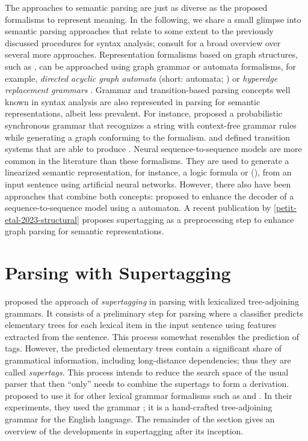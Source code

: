 \documentclass[../document.tex]{subfiles}
\begin{document}
    The approaches to semantic parsing are just as diverse as the proposed formalisms to represent meaning.
    In the following, we share a small glimpse into semantic parsing approaches that relate to some extent to the previously discussed procedures for syntax analysis; consult \citet{kamath2018survey} for a broad overview over several more approaches.
    Representation formalisms based on graph structures, such as , can be approached using graph grammar or automata formalisms, for example, \emph{directed acyclic graph automata} (short:  automata; \citealp{fancellu-etal-2019-semantic}) or \emph{hyperedge replacement grammars} \citep{drewes1997hyperedge}.
    Grammar and transition-based parsing concepts well known in syntax analysis are also represented in parsing for semantic representations, albeit less prevalent.
    For instance, \citet{peng2015synchronous} proposed a probabilistic synchronous grammar that recognizes a string with context-free grammar rules while generating a graph conforming to the  formalism.
     and \citet{vilares-gomez-rodriguez-2018-transition} defined transition systems that are able to produce .
    Neural sequence-to-sequence models are more common in the literature than these formalisms.
    They are used to generate a linearized semantic representation, for instance, a logic formula \citep{dong-lapata-2016-language} or  (\citep{zhang-etal-2019-amr}), from an input sentence using artificial neural networks.
    However, there also have been approaches that combine both concepts:  proposed to enhance the decoder of a sequence-to-sequence model using a  automaton.
    A recent publication by \cref{petit-etal-2023-structural} proposes supertagging as a preprocessing step to enhance graph parsing for semantic representations.

    \section{Parsing with Supertagging}\label{sec:literature:supertagging}
     proposed the approach of \emph{supertagging} in parsing with lexicalized tree-adjoining grammars.
    It consists of a preliminary step for parsing where a classifier predicts elementary trees for each lexical item in the input sentence using features extracted from the sentence.
    This process somewhat resembles the prediction of  tags.
    However, the predicted elementary trees contain a significant share of grammatical information, including long-distance dependencies; thus they are called \emph{supertags}.
    This process intends to reduce the search space of the usual parser that then ``only'' needs to combine the supertags to form a derivation.
     proposed to use it for other lexical grammar formalisms such as  and .
    In their experiments, they used the  grammar \citep{xtag01}; it is a hand-crafted tree-adjoining grammar for the English language.
    The remainder of the section gives an overview of the developments in supertagging after its inception.
\end{document}
